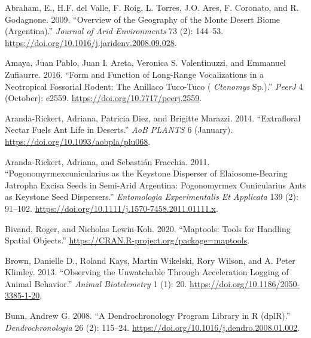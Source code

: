 \documentclass[msc,numbers,hidelinks]{coppe}
\newlength{\cslhangindent}
\newenvironment{CSLReferences}[2] %
 {%
  \setlength{\parindent}{0pt}
  \ifodd #1 \everypar{\setlength{\hangindent}{\cslhangindent}}\ignorespaces\fi
  \ifnum #2 > 0
  \setlength{\parskip}{#2\baselineskip}
  \fi
 }%
 {}
\begin{document}

  \noindent
  \setlength{\parindent}{-0.20in}
  \setlength{\leftskip}{0.20in}
  \setlength{\parskip}{8pt}

  \hypertarget{refs}{}
  \begin{CSLReferences}{1}{0}
  \leavevmode{}%
  Abraham, E., H.F. del Valle, F. Roig, L. Torres, J.O. Ares, F. Coronato, and R. Godagnone. 2009. {``Overview of the Geography of the Monte Desert Biome (Argentina).''} \emph{Journal of Arid Environments} 73 (2): 144--53. \url{https://doi.org/10.1016/j.jaridenv.2008.09.028}.

  \leavevmode{}%
  Amaya, Juan Pablo, Juan I. Areta, Veronica S. Valentinuzzi, and Emmanuel Zufiaurre. 2016. {``Form and Function of Long-Range Vocalizations in a Neotropical Fossorial Rodent: The Anillaco Tuco-Tuco ( {\emph{Ctenomys}} Sp.).''} \emph{PeerJ} 4 (October): e2559. \url{https://doi.org/10.7717/peerj.2559}.

  \leavevmode{}%
  Aranda-Rickert, Adriana, Patricia Diez, and Brigitte Marazzi. 2014. {``Extrafloral Nectar Fuels Ant Life in Deserts.''} \emph{AoB PLANTS} 6 (January). \url{https://doi.org/10.1093/aobpla/plu068}.

  \leavevmode{}%
  Aranda-Rickert, Adriana, and Sebastián Fracchia. 2011. {``Pogonomyrmexcunicularius as the Keystone Disperser of Elaiosome-Bearing Jatropha Excisa Seeds in Semi-Arid Argentina: Pogonomyrmex Cunicularius Ants as Keystone Seed Dispersers.''} \emph{Entomologia Experimentalis Et Applicata} 139 (2): 91--102. \url{https://doi.org/10.1111/j.1570-7458.2011.01111.x}.

  \leavevmode{}%
  Bivand, Roger, and Nicholas Lewin-Koh. 2020. {``Maptools: Tools for Handling Spatial Objects.''} \url{https://CRAN.R-project.org/package=maptools}.

  \leavevmode{}%
  Brown, Danielle D., Roland Kays, Martin Wikelski, Rory Wilson, and A. Peter Klimley. 2013. {``Observing the Unwatchable Through Acceleration Logging of Animal Behavior.''} \emph{Animal Biotelemetry} 1 (1): 20. \url{https://doi.org/10.1186/2050-3385-1-20}.

  \leavevmode{}%
  Bunn, Andrew G. 2008. {``A Dendrochronology Program Library in R (dplR).''} \emph{Dendrochronologia} 26 (2): 115--24. \url{https://doi.org/10.1016/j.dendro.2008.01.002}.


\end{CSLReferences}
\end{document}
